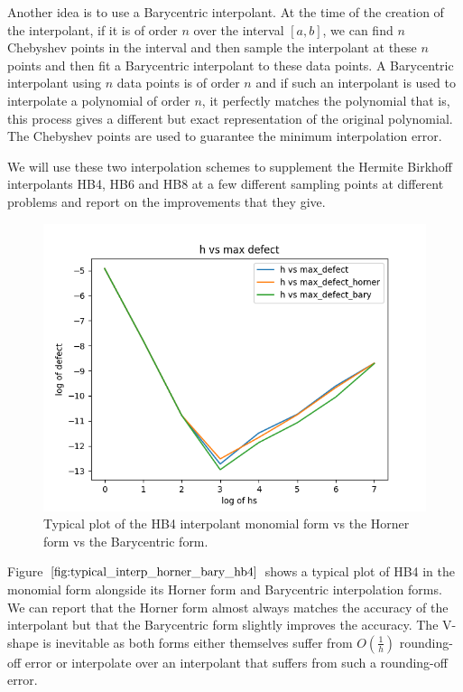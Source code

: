 Another idea is to use a Barycentric interpolant. At the time of the creation of the interpolant, if it is of order $n$ over the interval $[a, b]$, we can find $n$ Chebyshev points in the interval and then sample the interpolant at these $n$ points and then fit a Barycentric interpolant to these data points. A Barycentric interpolant using $n$ data points is of order $n$ and if such an interpolant is used to interpolate a polynomial of order $n$, it perfectly matches the polynomial that is, this process gives a different but exact representation of the original polynomial. The Chebyshev points are used to guarantee the minimum interpolation error.

We will use these two interpolation schemes to supplement the Hermite Birkhoff interpolants HB4, HB6 and HB8 at a few different sampling points at different problems and report on the improvements that they give.

\begin{figure}[H]
\centering
\includegraphics[width=0.7\linewidth]{./figures/typical_interp_horner_bary_hb4}
\caption{Typical plot of the HB4 interpolant monomial form vs the Horner form vs the Barycentric form.}
\label{fig:typical_interp_horner_bary_hb4}
\end{figure}

Figure $\ref{fig:typical_interp_horner_bary_hb4}$ shows a typical plot of HB4 in the monomial form alongside its Horner form and Barycentric interpolation forms. We can report that the Horner form almost always matches the accuracy of the interpolant but that the Barycentric form slightly improves the accuracy. The V-shape is inevitable as both forms either themselves suffer from $O(\frac{1}{h})$ rounding-off error or interpolate over an interpolant that suffers from such a rounding-off error.

